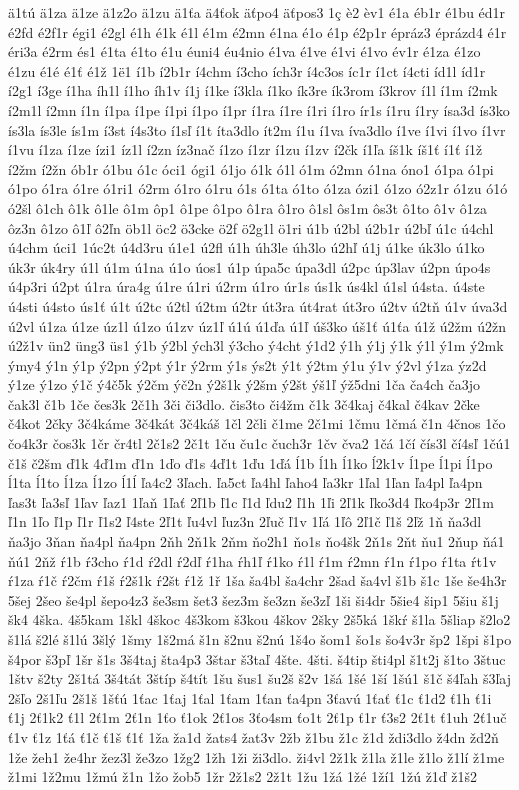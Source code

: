 {ä1tú
ä1za
ä1ze
ä1z2o
ä1zu
ä1ťa
ä4ťok
äťpo4
äťpos3
1ç
è2
èv1
é1a
éb1r
é1bu
éd1r
é2fd
é2f1r
égi1
é2gl
é1h
é1k
é1l
é1m
é2mn
é1na
é1o
é1p
é2p1r
épráz3
éprázd4
é1r
éri3a
é2rm
és1
é1ta
é1to
é1u
éuni4
éu4nio
é1va
é1ve
é1vi
é1vo
év1r
é1za
é1zo
é1zu
é1é
é1ť
é1ž
1ë1
í1b
í2b1r
í4chm
í3cho
ích3r
í4c3os
íc1r
í1ct
í4cti
íd1l
íd1r
í2g1
í3ge
í1ha
íh1l
í1ho
íh1v
í1j
í1ke
í3kla
í1ko
ík3re
ík3rom
í3krov
í1l
í1m
í2mk
í2m1l
í2mn
í1n
í1pa
í1pe
í1pi
í1po
í1pr
í1ra
í1re
í1ri
í1ro
ír1s
í1ru
í1ry
ísa3d
ís3ko
ís3la
ís3le
ís1m
í3st
í4s3to
í1sľ
í1t
íta3dlo
ít2m
í1u
í1va
íva3dlo
í1ve
í1vi
í1vo
í1vr
í1vu
í1za
í1ze
ízi1
íz1l
í2zn
íz3nač
í1zo
í1zr
í1zu
í1zv
í2čk
í1ľa
íš1k
íš1ť
í1ť
í1ž
í2žm
í2žn
ób1r
ó1bu
ó1c
óci1
ógi1
ó1jo
ó1k
ó1l
ó1m
ó2mn
ó1na
óno1
ó1pa
ó1pi
ó1po
ó1ra
ó1re
ó1ri1
ó2rm
ó1ro
ó1ru
ó1s
ó1ta
ó1to
ó1za
ózi1
ó1zo
ó2z1r
ó1zu
ó1ó
ó2šl
ô1ch
ô1k
ô1le
ô1m
ôp1
ô1pe
ô1po
ô1ra
ô1ro
ô1sl
ôs1m
ôs3t
ô1to
ô1v
ô1za
ôz3n
ô1zo
ô1ľ
ô2ľn
öb1l
öc2
ö3cke
ö2f
ö2g1l
ö1ri
ú1b
ú2bl
ú2b1r
ú2bľ
ú1c
ú4chl
ú4chm
úci1
1úc2t
ú4d3ru
ú1e1
ú2fl
ú1h
úh3le
úh3lo
ú2hľ
ú1j
ú1ke
úk3lo
ú1ko
úk3r
úk4ry
ú1l
ú1m
ú1na
ú1o
úos1
ú1p
úpa5c
úpa3dl
ú2pc
úp3lav
ú2pn
úpo4s
ú4p3ri
ú2pt
ú1ra
úra4g
ú1re
ú1ri
ú2rm
ú1ro
úr1s
ús1k
ús4kl
ú1sl
ú4sta.
ú4ste
ú4sti
ú4sto
ús1ť
ú1t
ú2tc
ú2tl
ú2tm
ú2tr
út3ra
út4rat
út3ro
ú2tv
ú2tň
ú1v
úva3d
ú2vl
ú1za
ú1ze
úz1l
ú1zo
ú1zv
úz1ľ
ú1ú
ú1ďa
ú1ľ
úš3ko
úš1ť
ú1ťa
ú1ž
ú2žm
ú2žn
ú2ž1v
ün2
üng3
üs1
ý1b
ý2bl
ých3l
ý3cho
ý4cht
ý1d2
ý1h
ý1j
ý1k
ý1l
ý1m
ý2mk
ýmy4
ý1n
ý1p
ý2pn
ý2pt
ý1r
ý2rm
ý1s
ýs2t
ý1t
ý2tm
ý1u
ý1v
ý2vl
ý1za
ýz2d
ý1ze
ý1zo
ý1č
ý4č5k
ý2čm
ýč2n
ý2š1k
ý2šm
ý2št
ýš1ľ
ýž5dni
1ča
ča4ch
ča3jo
čak3l
č1b
1če
čes3k
2č1h
3či
či3dlo.
čis3to
či4žm
č1k
3č4kaj
č4kal
č4kav
2čke
č4kot
2čky
3č4káme
3č4kát
3č4káš
1čl
2čli
č1me
2č1mi
1čmu
1čmá
č1n
4čnos
1čo
čo4k3r
čos3k
1čr
čr4tl
2č1s2
2č1t
1ču
ču1c
čuch3r
1čv
čva2
1čá
1čí
čís3l
čí4sľ
1čú1
č1š
č2šm
ď1k
4ď1m
ď1n
1ďo
ď1s
4ď1t
1ďu
1ďá
ĺ1b
ĺ1h
ĺ1ko
ĺ2k1v
ĺ1pe
ĺ1pi
ĺ1po
ĺ1ta
ĺ1to
ĺ1za
ĺ1zo
ĺ1ĺ
ľa4c2
3ľach.
ľa5ct
ľa4hl
ľaho4
ľa3kr
1ľal
1ľan
ľa4pl
ľa4pn
ľas3t
ľa3sľ
1ľav
ľaz1
1ľaň
1ľať
2ľ1b
ľ1c
ľ1d
ľdu2
ľ1h
1ľi
2ľ1k
ľko3d4
ľko4p3r
2ľ1m
ľ1n
1ľo
ľ1p
ľ1r
ľ1s2
ľ4ste
2ľ1t
ľu4vl
ľuz3n
2ľuč
ľ1v
1ľá
1ľô
2ľ1č
ľ1š
2ľž
1ň
ňa3dl
ňa3jo
3ňan
ňa4pl
ňa4pn
2ňh
2ň1k
2ňm
ňo2h1
ňo1s
ňo4šk
2ň1s
2ňt
ňu1
2ňup
ňá1
ňú1
2ňž
ŕ1b
ŕ3cho
ŕ1d
ŕ2dl
ŕ2dľ
ŕ1ha
ŕh1ľ
ŕ1ko
ŕ1l
ŕ1m
ŕ2mn
ŕ1n
ŕ1po
ŕ1ta
ŕt1v
ŕ1za
ŕ1č
ŕ2čm
ŕ1š
ŕ2š1k
ŕ2št
ŕ1ž
1ř
1ša
ša4bl
ša4chr
2šad
ša4vl
š1b
š1c
1še
še4h3r
5šej
2šeo
še4pl
šepo4z3
še3sm
šet3
šez3m
še3zn
še3zľ
1ši
ši4dr
5šie4
šip1
5šiu
š1j
šk4
4ška.
4š5kam
1škl
4škoc
4š3kom
š3kou
4škov
2šky
2š5ká
1škŕ
š1la
5šliap
š2lo2
š1lá
š2lé
š1lú
3šlý
1šmy
1š2má
š1n
š2nu
š2nú
1š4o
šom1
šo1s
šo4v3r
šp2
1špi
š1po
š4por
š3pľ
1šr
š1s
3š4taj
šta4p3
3štar
š3taľ
4šte.
4šti.
š4tip
šti4pl
š1t2j
š1to
3štuc
1štv
š2ty
2š1tá
3š4tát
3štíp
š4tít
1šu
šus1
šu2š
š2v
1šá
1šé
1ší
1šú1
š1č
š4ľah
š3ľaj
2šľo
2š1ľu
2š1š
1šťú
1ťac
1ťaj
1ťal
1ťam
1ťan
ťa4pn
3ťavú
1ťať
ť1c
ť1d2
ť1h
ť1i
ť1j
2ť1k2
ť1l
2ť1m
2ť1n
1ťo
ť1ok
2ť1os
3ťo4sm
ťo1t
2ť1p
ť1r
ť3s2
2ť1t
ť1uh
2ť1uč
ť1v
ť1z
1ťá
ť1č
ť1š
ť1ť
1ža
ža1d
žats4
žat3v
2žb
ž1bu
ž1c
ž1d
ždi3dlo
ž4dn
žd2ň
1že
žeh1
že4hr
žez3l
že3zo
1žg2
1žh
1ži
ži3dlo.
ži4vl
2ž1k
ž1la
ž1le
ž1lo
ž1lí
ž1me
ž1mi
1ž2mu
1žmú
ž1n
1žo
žob5
1žr
2ž1s2
2ž1t
1žu
1žá
1žé
1ží1
1žú
ž1ď
ž1š2
}
